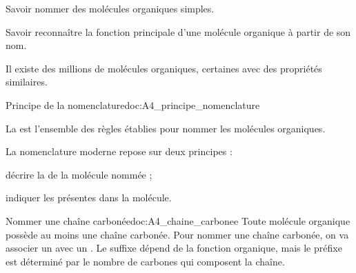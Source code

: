 \tetePremStssOrga


\begin{objectifs}
  \item Savoir nommer des molécules organiques simples.
  \item Savoir reconnaître la fonction principale d'une molécule organique à partir de son nom.
\end{objectifs}

\begin{contexte}
  Il existe des millions de molécules organiques, certaines avec des propriétés similaires.

\end{contexte}


\begin{doc}{Principe de la nomenclature}{doc:A4_principe_nomenclature}
  \begin{importants}  
    La  est l'ensemble des règles établies pour nommer les molécules organiques.
  \end{importants}
   
  La nomenclature moderne repose sur deux principes :
  \begin{listePoints}
    \item décrire la  de la molécule nommée ;
    \item indiquer les  présentes dans la molécule.
  \end{listePoints}
\end{doc}

\begin{doc}{Nommer une chaîne carbonée}{doc:A4_chaine_carbonee}
  Toute molécule organique possède au moins une chaîne carbonée.
  Pour nommer une chaîne carbonée, on va associer un  avec un .
  Le suffixe dépend de la fonction organique, mais le préfixe est déterminé par le nombre de carbones qui composent la chaîne.
  
\end{doc}


